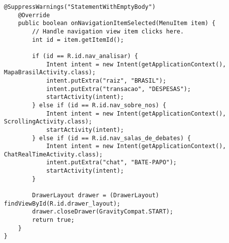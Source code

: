 \documentclass[12pt,a4paper]{article}
\begin{document}
\begin{lstlisting}[caption=./mobile/src/main/java/app/transparenciaeducativa/MainActivity.java]
    @SuppressWarnings("StatementWithEmptyBody")
    @Override
    public boolean onNavigationItemSelected(MenuItem item) {
        // Handle navigation view item clicks here.
        int id = item.getItemId();

        if (id == R.id.nav_analisar) {
            Intent intent = new Intent(getApplicationContext(), MapaBrasilActivity.class);
            intent.putExtra("raiz", "BRASIL");
            intent.putExtra("transacao", "DESPESAS");
            startActivity(intent);
        } else if (id == R.id.nav_sobre_nos) {
            Intent intent = new Intent(getApplicationContext(), ScrollingActivity.class);
            startActivity(intent);
        } else if (id == R.id.nav_salas_de_debates) {
            Intent intent = new Intent(getApplicationContext(), ChatRealTimeActivity.class);
            intent.putExtra("chat", "BATE-PAPO");
            startActivity(intent);
        }

        DrawerLayout drawer = (DrawerLayout) findViewById(R.id.drawer_layout);
        drawer.closeDrawer(GravityCompat.START);
        return true;
    }
}
\end{lstlisting}
\pagebreak
\end{document}
